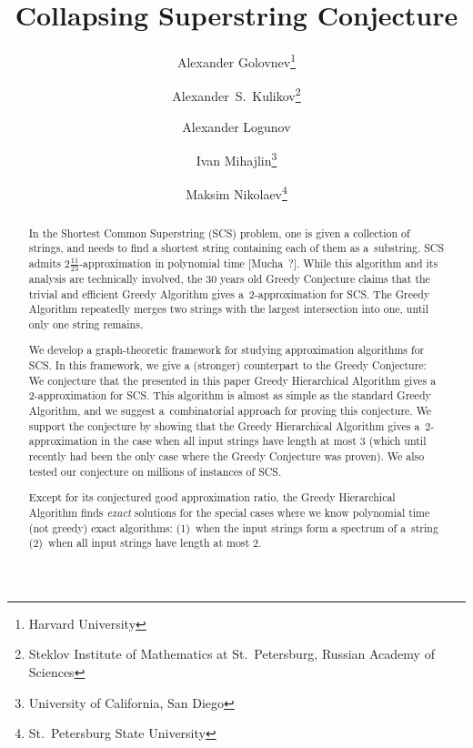\documentclass[11pt]{article}
\begin{document}

\sloppy
\begin{titlepage}
\title{Collapsing Superstring Conjecture}
\author{
Alexander Golovnev\thanks{Harvard University}
\and
Alexander~S.~Kulikov\thanks{Steklov Institute of Mathematics at St.~Petersburg, Russian Academy of Sciences}
\and
Alexander Logunov\footnotemark[2]
\and
Ivan Mihajlin\thanks{University of California, San Diego}
\and 
Maksim Nikolaev\thanks{St.~Petersburg State University}
}
\maketitle
\thispagestyle{empty}

\begin{abstract}
In the Shortest Common Superstring (SCS) problem, one is given a collection of strings, and needs to find a shortest string containing each of them as a~substring. SCS admits $2\frac{11}{23}$-approximation in polynomial time [Mucha~?]. While this algorithm and its analysis are technically involved, the $30$ years old Greedy Conjecture claims that the trivial and efficient Greedy Algorithm gives a~$2$-approximation for SCS. The Greedy Algorithm repeatedly merges two strings with the largest intersection into one, until only one string remains.

We develop a graph-theoretic framework for studying approximation algorithms for SCS. In this framework, we give a (stronger) counterpart to the Greedy Conjecture: We conjecture that the presented in this paper Greedy Hierarchical Algorithm gives a $2$-approximation for SCS. This algorithm is almost as simple as the standard Greedy Algorithm, and we suggest a~combinatorial approach for proving this conjecture. We support the conjecture by showing that the Greedy Hierarchical Algorithm gives a~$2$-approximation in the case when all input strings have length at most $3$ (which until recently had been the only case where the Greedy Conjecture was proven). We also tested our conjecture on millions of instances of SCS.

Except for its conjectured good approximation ratio, the Greedy Hierarchical Algorithm finds \emph{exact} solutions for the special cases where we know polynomial time (not greedy) exact algorithms: (1)~when the input strings form a spectrum of a~string (2)~when all input strings have length at most $2$.
\end{abstract}
\end{titlepage}

\tableofcontents









\appendix


\end{document}
